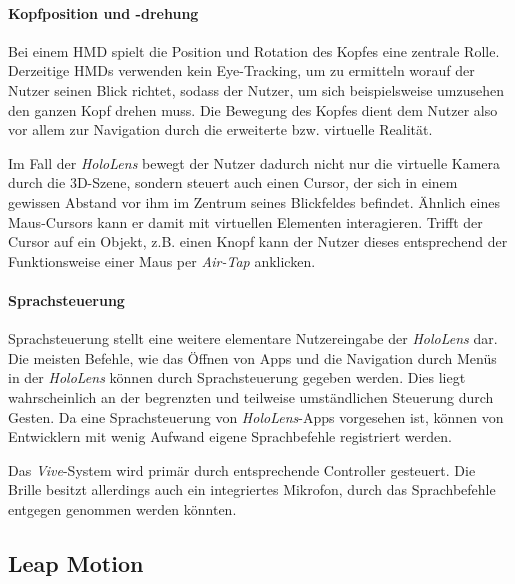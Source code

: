 \paragraph{Kopfposition und -drehung}

Bei einem HMD spielt die Position und Rotation des Kopfes eine zentrale Rolle. 
Derzeitige HMDs verwenden kein Eye-Tracking, um zu ermitteln worauf der Nutzer seinen Blick richtet, sodass der Nutzer, um sich beispielsweise umzusehen den ganzen Kopf drehen muss. Die Bewegung des Kopfes dient dem Nutzer also vor allem zur Navigation durch die erweiterte bzw. virtuelle Realität. 

Im Fall der \textit{HoloLens} bewegt der Nutzer dadurch nicht nur die virtuelle Kamera durch die 3D-Szene, sondern steuert auch einen Cursor, der sich in einem gewissen Abstand vor ihm im Zentrum seines Blickfeldes befindet. Ähnlich eines Maus-Cursors kann er damit mit virtuellen Elementen interagieren. Trifft der Cursor auf ein Objekt, z.B. einen Knopf kann der Nutzer dieses entsprechend der Funktionsweise einer Maus per \textit{Air-Tap} anklicken. 

\paragraph{Sprachsteuerung}

Sprachsteuerung stellt eine weitere elementare Nutzereingabe der \textit{HoloLens} dar. 
Die meisten Befehle, wie das Öffnen von Apps und die Navigation durch Menüs in der \textit{HoloLens} können durch Sprachsteuerung gegeben werden. 
Dies liegt wahrscheinlich an der begrenzten und teilweise umständlichen Steuerung durch Gesten. Da eine Sprachsteuerung von \textit{HoloLens}-Apps vorgesehen ist, können von Entwicklern mit wenig Aufwand eigene Sprachbefehle registriert werden.

Das \textit{Vive}-System wird primär durch entsprechende Controller gesteuert. Die Brille besitzt allerdings auch ein integriertes Mikrofon, durch das Sprachbefehle entgegen genommen werden könnten.


\subsection{Leap Motion}

